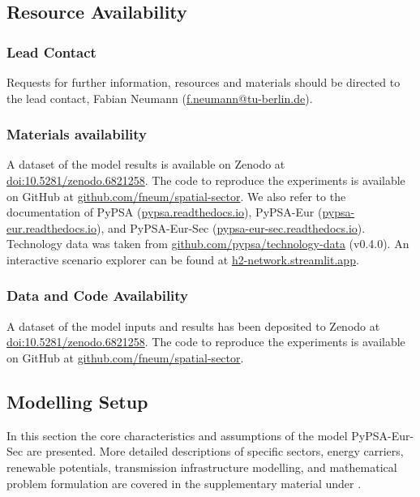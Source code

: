 \subsection*{Resource Availability}

\subsubsection*{Lead Contact}

Requests for further information, resources and materials should be directed to
the lead contact, Fabian Neumann
(\href{mailto:f.neumann@tu-berlin.de}{f.neumann@tu-berlin.de}).

\subsubsection*{Materials availability}

A dataset of the model results is available on Zenodo at \href{https://doi.org/10.5281/zenodo.6821258}{doi:10.5281/zenodo.6821258}.
The code to reproduce the experiments is available on GitHub at \href{https://github.com/fneum/spatial-sector}{github.com/fneum/spatial-sector}.
We also refer to the documentation of PyPSA (\href{https://pypsa.readthedocs.io}{pypsa.readthedocs.io}),
PyPSA-Eur (\href{https://pypsa-eur.readthedocs.io}{pypsa-eur.readthedocs.io}), and
PyPSA-Eur-Sec (\href{https://pypsa-eur-sec.readthedocs.io}{pypsa-eur-sec.readthedocs.io}).
Technology data was taken from \href{https://github.com/pypsa/technology-data}{github.com/pypsa/technology-data} (v0.4.0).
An interactive scenario explorer can be found at \href{https://h2-network.streamlit.app}{h2-network.streamlit.app}.

\subsubsection*{Data and Code Availability}

A dataset of the model inputs and results has been deposited to Zenodo at
\href{https://doi.org/10.5281/zenodo.6821258}{doi:10.5281/zenodo.6821258}. The
code to reproduce the experiments is available on GitHub at
\href{https://github.com/fneum/spatial-sector}{github.com/fneum/spatial-sector}.

\subsection*{Modelling Setup}

In this section the core characteristics and assumptions of the model
PyPSA-Eur-Sec are presented. More detailed descriptions of specific sectors,
energy carriers, renewable potentials, transmission infrastructure modelling,
and mathematical problem formulation are covered in the supplementary material
under .


